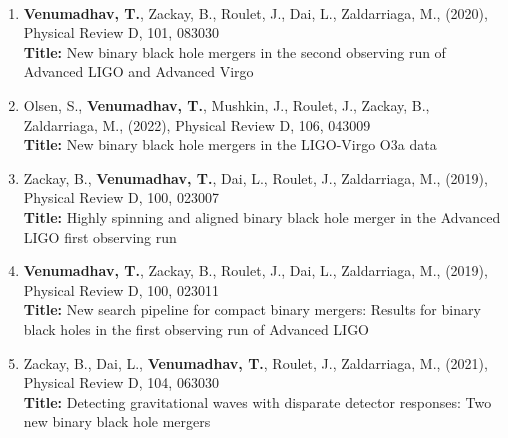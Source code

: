\documentclass{article}
\newcommand{\prd}{Physical Review D}
\begin{document}
\pagestyle{empty}

\noindent\underline{}
\\

{\addtolength{\leftskip}{10mm}
\begin{enumerate}[leftmargin=*,itemsep=0.45em,topsep=0.35em]
\item \textbf{Venumadhav, T.}, Zackay, B., Roulet, J., Dai, L., Zaldarriaga, M., (2020), \prd, 101, 083030 \\
\textbf{Title:} New binary black hole mergers in the second observing run of Advanced LIGO and Advanced Virgo
\item Olsen, S., \textbf{Venumadhav, T.}, Mushkin, J., Roulet, J., Zackay, B., Zaldarriaga, M., (2022), \prd, 106, 043009 \\
\textbf{Title:} New binary black hole mergers in the LIGO-Virgo O3a data
\item Zackay, B., \textbf{Venumadhav, T.}, Dai, L., Roulet, J., Zaldarriaga, M., (2019), \prd, 100, 023007 \\
\textbf{Title:} Highly spinning and aligned binary black hole merger in the Advanced LIGO first observing run
\item \textbf{Venumadhav, T.}, Zackay, B., Roulet, J., Dai, L., Zaldarriaga, M., (2019), \prd, 100, 023011 \\
\textbf{Title:} New search pipeline for compact binary mergers: Results for binary black holes in the first observing run of Advanced LIGO
\item Zackay, B., Dai, L., \textbf{Venumadhav, T.}, Roulet, J., Zaldarriaga, M., (2021), \prd, 104, 063030 \\
\textbf{Title:} Detecting gravitational waves with disparate detector responses: Two new binary black hole mergers
\end{enumerate}
\par}

\noindent\underline{}
\\
\end{document}
